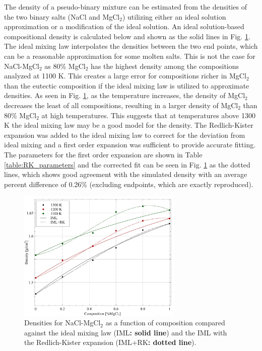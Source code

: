\documentclass[review]{elsarticle}
\providecommand{\DIFaddtex}[1]{{\bf #1}} %
\providecommand{\DIFaddFL}[1]{\DIFadd{#1}} %
\providecommand{\DIFaddbeginFL}{} %
\providecommand{\DIFaddendFL}{} %
\providecommand{\DIFdelbeginFL}{} %
\providecommand{\DIFdelendFL}{} %
\providecommand{\DIFadd}[1]{\texorpdfstring{\DIFaddtex{#1}}{#1}} %
\newcommand{\DIFscaledelfig}{0.5}
\newlength{\DIFdelgraphicswidth} %
\newlength{\DIFdelgraphicsheight} %
\newcommand{\DIFaddincludegraphics}[2][]{{\color{blue}\fbox{\DIFOincludegraphics[#1]{#2}}}} %
\newcommand{\DIFdelincludegraphics}[2][]{%
\sbox{\DIFdelgraphicsbox}{\DIFOincludegraphics[#1]{#2}}%
\settoboxwidth{\DIFdelgraphicswidth}{\DIFdelgraphicsbox} %
\settoboxtotalheight{\DIFdelgraphicsheight}{\DIFdelgraphicsbox} %
\scalebox{\DIFscaledelfig}{%
\parbox[b]{\DIFdelgraphicswidth}{\usebox{\DIFdelgraphicsbox}\\[-\baselineskip] \rule{\DIFdelgraphicswidth}{0em}}\llap{\resizebox{\DIFdelgraphicswidth}{\DIFdelgraphicsheight}{%
\setlength{\unitlength}{\DIFdelgraphicswidth}%
\begin{picture}(1,1)%
\thicklines\linethickness{2pt} %
{\color[rgb]{1,0,0}\put(0,0){\framebox(1,1){}}}%
{\color[rgb]{1,0,0}\put(0,0){\line( 1,1){1}}}%
{\color[rgb]{1,0,0}\put(0,1){\line(1,-1){1}}}%
\end{picture}%
}\hspace*{3pt}}} %
} %
\DeclareRobustCommand{\DIFaddbeginFL}{\DIFOaddbeginFL \let\includegraphics\DIFaddincludegraphics} %
\DeclareRobustCommand{\DIFaddendFL}{\DIFOaddendFL \let\includegraphics\DIFOincludegraphics} %
\DeclareRobustCommand{\DIFdelbeginFL}{\DIFOdelbeginFL \let\includegraphics\DIFdelincludegraphics} %
\DeclareRobustCommand{\DIFdelendFL}{\DIFOaddendFL \let\includegraphics\DIFOincludegraphics} %
\begin{document}
The density of a pseudo-binary mixture can be estimated from the densities of the two binary salts (NaCl and MgCl$_2$) utilizing either an ideal solution approximation or a modification of the ideal solution. An ideal solution-based compositional density is calculated below and shown as the solid lines in Fig. \ref{fig:density_mixing}. The ideal mixing law interpolates the densities between the two end points, which can be a reasonable approximation for some molten salts. This is not the case for NaCl-MgCl$_2$ as 80\% MgCl$_2$ has the highest density among the compositions analyzed at 1100 K. This creates a large error for compositions richer in MgCl$_2$ than the eutectic composition if the ideal mixing law is utilized to approximate densities. As seen in Fig. \ref{fig:density_mixing}, as the temperature increases, the density of MgCl$_2$ decreases the least of all compositions, resulting in a larger density of MgCl$_2$ than 80\% MgCl$_2$ at high temperatures. This suggests that at temperatures above 1300 K the ideal mixing law may be a good model for the density. The Redlich-Kister expansion was added to the ideal mixing law to correct for the deviation from ideal mixing and a first order expansion was sufficient to provide accurate fitting. The parameters for the first order expansion are shown in Table \ref{table:RK_parameters} and the corrected fit can be seen in Fig. \ref{fig:density_mixing} as the dotted lines, which shows good agreement with the simulated density with an average percent difference of 0.26\% (excluding endpoints, which are exactly reproduced). 

\begin{figure}[h]
 \centering
 \DIFdelbeginFL %
\DIFdelendFL \DIFaddbeginFL \includegraphics[width=0.7\textwidth]{images/density_mixing.jpg} 
 \DIFaddendFL \caption{Densities for NaCl-MgCl$_2$ as a function of composition compared against the ideal mixing law (IML\DIFaddbeginFL \DIFaddFL{: solid line}\DIFaddendFL ) and the IML with the Redlich-Kister expansion (IML+RK\DIFaddbeginFL \DIFaddFL{: dotted line}\DIFaddendFL ).}
 \label{fig:density_mixing}
\end{figure} 
\end{document}
